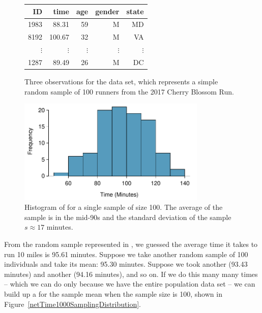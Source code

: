 \begin{figure}[h]
\centering
\begin{tabular}{rrrrr}
  \hline
ID & time & age & gender & state \\ 
  \hline
1983 & 88.31 & 59 & M & MD \\ 
8192 & 100.67 & 32 & M & VA \\ 
  $\vdots$ &   $\vdots$ &   $\vdots$ &   $\vdots$ &   $\vdots$ \\ 
1287 & 89.49 & 26 & M & DC \\ 
   \hline
\end{tabular}
\caption{Three observations for the  data set, which represents a simple random sample of 100 runners from the 2017 Cherry Blossom Run.}
\label{run17sampDF}
\end{figure}


\begin{figure}[h]
\centering
\includegraphics[width=0.8\textwidth]{ch_distributions/figures/run17sampHistograms/run17sampHistograms} 
\caption{Histogram of  for a single sample of size 100. The average of the sample is in the mid-90s and the standard deviation of the sample $s\approx 17$ minutes.
}
\label{run17sampHistograms}
\end{figure}

From the random sample represented in , we guessed the average time it takes to run 10 miles is 95.61 minutes. Suppose we take another random sample of 100 individuals and take its mean: 95.30 minutes. Suppose we took another (93.43 minutes) and another (94.16 minutes), and so on. If we do this many many times -- which we can do only because we have the entire population data set -- we can build up a  for the sample mean when the sample size is 100, shown in Figure~\ref{netTime1000SamplingDistribution}.


